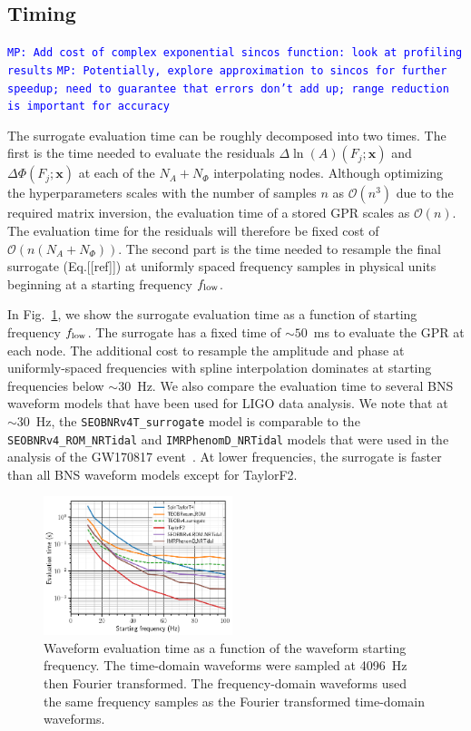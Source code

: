 \documentclass[prd,aps,letter,twocolumn,floatfix,notitlepage,nofootinbib]{revtex4-1}
\def\bx{\mathbf{x}}
\newcommand{\MP}[1]{{\textcolor{blue}{\texttt{MP: #1}} }}
\begin{document}
\subsection{Timing}

\MP{Add cost of complex exponential sincos function: look at profiling results}
\MP{Potentially, explore approximation to sincos for further speedup; need to guarantee that errors don't add up; range reduction is important for accuracy}

The surrogate evaluation time can be roughly decomposed into two times. The first is the time needed to evaluate the residuals $\Delta\ln(A)(F_j; \bx)$ and $\Delta\Phi(F_j; \bx)$ at each of the $N_A+N_\Phi$ interpolating nodes. Although optimizing the hyperparameters scales with the number of samples $n$ as $\mathcal{O}(n^3)$ due to the required matrix inversion, the evaluation time of a stored GPR scales as $\mathcal{O}(n)$. The evaluation time for the residuals will therefore be fixed cost of $\mathcal{O}(n(N_A+N_\Phi))$. The second part is the time needed to resample the final surrogate (Eq.[[ref]]) at uniformly spaced frequency samples in physical units beginning at a starting frequency $f_{\rm low}$.

In Fig.~\ref{fig:timing}, we show the surrogate evaluation time as a function of starting frequency $f_{\rm low}$. The surrogate has a fixed time of $\sim 50$~ms to evaluate the GPR at each node. The additional cost to resample the amplitude and phase at uniformly-spaced frequencies with spline interpolation dominates at starting frequencies below $\sim 30$~Hz. We also compare the evaluation time to several BNS waveform models that have been used for LIGO data analysis. We note that at $\sim 30$~Hz, the \texttt{SEOBNRv4T\_surrogate} model is comparable to the \texttt{SEOBNRv4\_ROM\_NRTidal} and \texttt{IMRPhenomD\_NRTidal} models that were used in the analysis of the GW170817 event~\cite{DietrichBernuzziTichy2017}. At lower frequencies, the surrogate is faster than all BNS waveform models except for TaylorF2. 

\begin{figure}[htb]
\centering
\includegraphics[width=0.49\textwidth]{timing.png}
\caption{Waveform evaluation time as a function of the waveform starting frequency. The time-domain waveforms
were sampled at 4096~Hz then Fourier transformed. The frequency-domain waveforms used the
same frequency samples as the Fourier transformed time-domain waveforms.}
\label{fig:timing}
\end{figure}
\end{document}
